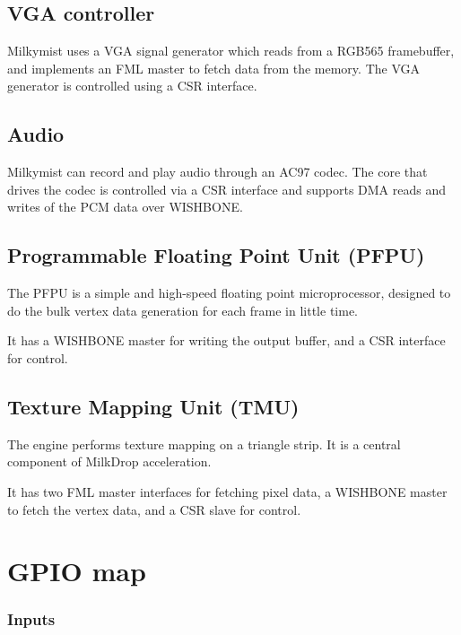 \documentclass[a4paper,11pt]{article}
\begin{document}
\subsection{VGA controller}
Milkymist uses a VGA signal generator which reads from a RGB565 framebuffer, and implements an FML master to fetch data from the memory. The VGA generator is controlled using a CSR interface.

\subsection{Audio}
Milkymist can record and play audio through an AC97 codec. The core that drives the codec is controlled via a CSR interface and supports DMA reads and writes of the PCM data over WISHBONE.

\subsection{Programmable Floating Point Unit (PFPU)}
The PFPU is a simple and high-speed floating point microprocessor, designed to do the bulk vertex data generation for each frame in little time.

It has a WISHBONE master for writing the output buffer, and a CSR interface for control.

\subsection{Texture Mapping Unit (TMU)}
The engine performs texture mapping on a triangle strip. It is a central component of MilkDrop acceleration.

It has two FML master interfaces for fetching pixel data, a WISHBONE master to fetch the vertex data, and a CSR slave for control.

\section{GPIO map}

\subsubsection{Inputs}
\end{document}
